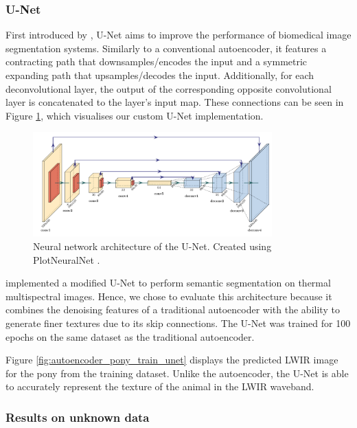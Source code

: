 \documentclass{l4proj}
\begin{document}
\subsubsection{U-Net}

First introduced by \citet{ronneberger_u-net_2015}, U-Net aims to improve the performance of biomedical image segmentation systems. Similarly to a conventional autoencoder, it features a contracting path that downsamples/encodes the input and a symmetric expanding path that upsamples/decodes the input. Additionally, for each deconvolutional layer, the output of the corresponding opposite convolutional layer is concatenated to the layer's input map. These connections can be seen in Figure \ref{fig:unet_architecture}, which visualises our custom U-Net implementation. 

\begin{figure}[ht]
  \centering
  \includegraphics[width=0.82\textwidth]{images/models/unet}
  \caption{Neural network architecture of the U-Net. Created using PlotNeuralNet \citep{iqbal_harisiqbal88plotneuralnet_2018}.}
  \label{fig:unet_architecture}
\end{figure}

\citet{osin_fast_2018} implemented a modified U-Net to perform semantic segmentation on thermal multispectral images. Hence, we chose to evaluate this architecture because it combines the denoising features of a traditional autoencoder with the ability to generate finer textures due to its skip connections. The U-Net was trained for 100 epochs on the same dataset as the traditional autoencoder. 

Figure \ref{fig:autoencoder_pony_train_unet} displays the predicted LWIR image for the pony from the training dataset. Unlike the autoencoder, the U-Net is able to accurately represent the texture of the animal in the LWIR waveband.

\subsubsection{Results on unknown data}
\end{document}
